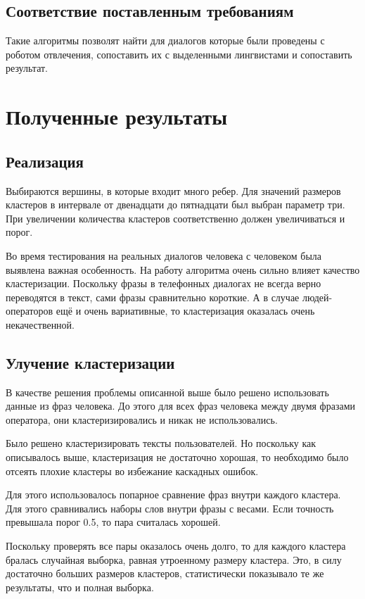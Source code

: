 \documentclass[specification,annotation]{itmo-student-thesis}
\begin{document}
	
	\section{Соответствие поставленным требованиям}
	Такие алгоритмы позволят найти для диалогов которые были проведены с роботом отвлечения, сопоставить их с выделенными лингвистами и сопоставить результат.
	
	\chapter{Полученные результаты}
	\section{Реализация}
	Выбираются вершины, в которые входит много ребер. Для значений размеров кластеров в интервале от двенадцати до пятнадцати был выбран параметр три. При увеличении количества кластеров соответственно должен увеличиваться и порог.
	
	Во время тестирования на реальных диалогов человека с человеком была выявлена важная особенность. На работу алгоритма очень сильно влияет качество кластеризации. Поскольку фразы в телефонных диалогах не всегда верно переводятся в текст, сами фразы сравнительно короткие. А в случае людей-операторов ещё и очень вариативные, то кластеризация оказалась очень некачественной.
	\section{Улучение кластеризации}
	В качестве решения проблемы описанной выше было решено использовать данные из фраз человека. До этого для всех фраз человека между двумя фразами оператора, они кластеризировались и никак не использовались. 
	
	Было решено кластеризировать тексты пользователей. Но поскольку как описывалось выше, кластеризация не достаточно хорошая, то необходимо было отсеять плохие кластеры во избежание каскадных ошибок.
	
	Для этого использовалось попарное сравнение фраз внутри каждого кластера. Для этого сравнивались наборы слов внутри фразы с весами. Если точность превышала порог 0.5, то пара считалась хорошей.
	
	Поскольку проверять все пары оказалось очень долго, то для каждого кластера бралась случайная выборка, равная утроенному размеру кластера. Это, в силу достаточно больших размеров кластеров, статистически показывало те же результаты, что и полная выборка.
	
\end{document}
